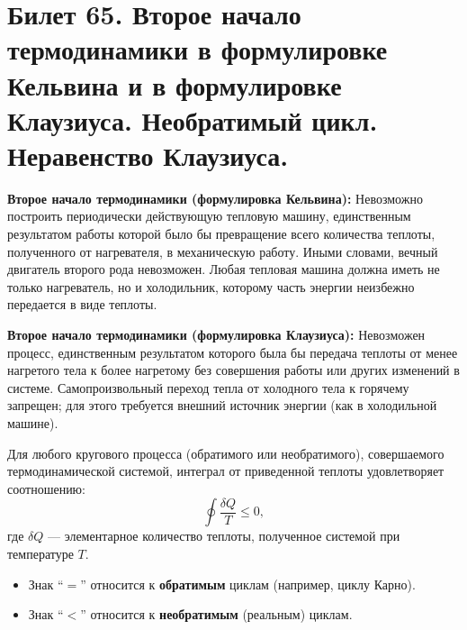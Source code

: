\section{Билет 65. Второе начало термодинамики в формулировке Кельвина и в формулировке Клаузиуса. Необратимый цикл. Неравенство Клаузиуса.}

\begin{definition}
\textbf{Второе начало термодинамики (формулировка Кельвина):} Невозможно построить периодически действующую тепловую машину, единственным результатом работы которой было бы превращение всего количества теплоты, полученного от нагревателя, в механическую работу. Иными словами, вечный двигатель второго рода невозможен. Любая тепловая машина должна иметь не только нагреватель, но и холодильник, которому часть энергии неизбежно передается в виде теплоты.
\end{definition}

\begin{definition}
\textbf{Второе начало термодинамики (формулировка Клаузиуса):} Невозможен процесс, единственным результатом которого была бы передача теплоты от менее нагретого тела к более нагретому без совершения работы или других изменений в системе. Самопроизвольный переход тепла от холодного тела к горячему запрещен; для этого требуется внешний источник энергии (как в холодильной машине).
\end{definition}

\begin{theorem}
Для любого кругового процесса (обратимого или необратимого), совершаемого термодинамической системой, интеграл от приведенной теплоты удовлетворяет соотношению:
\begin{equation}
    \oint \frac{\delta Q}{T} \le 0, \label{eq:clausius_ineq_65}
\end{equation}
где $\delta Q$ --- элементарное количество теплоты, полученное системой при температуре $T$.
\begin{itemize}
    \item Знак ``$=$'' относится к \textbf{обратимым} циклам (например, циклу Карно).
    \item Знак ``$<$'' относится к \textbf{необратимым} (реальным) циклам.
\end{itemize}
\end{theorem}

